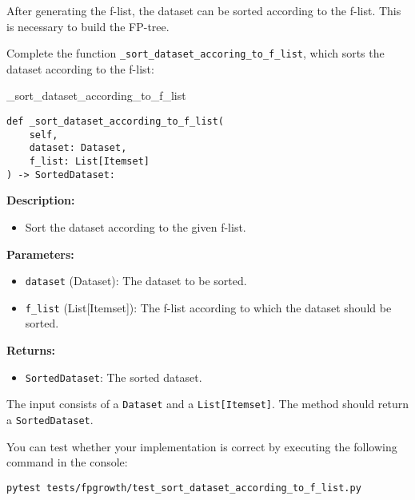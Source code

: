 \documentclass[
english,
smallborders
]{i6prcsht}
\begin{document}
After generating the f-list, the dataset can be sorted according to the f-list. This is necessary to build the FP-tree.

Complete the function \texttt{\_sort\_dataset\_accoring\_to\_f\_list}, which sorts the dataset according to the f-list:

\vspace*{0.3cm}

\begin{functionbox}{\_sort\_dataset\_according\_to\_f\_list}
	\begin{lstlisting}[numbers=none]
def _sort_dataset_according_to_f_list(
    self, 
    dataset: Dataset, 
    f_list: List[Itemset]
) -> SortedDataset:
\end{lstlisting}
	
	\textbf{Description:}
	\begin{itemize}[leftmargin=*,topsep=0pt]
		\item Sort the dataset according to the given f-list.
	\end{itemize}
	
	\textbf{Parameters:}
	\begin{itemize}[leftmargin=*,topsep=0pt]
		\item \texttt{dataset} (Dataset): The dataset to be sorted.
		\item \texttt{f\_list} (List[Itemset]): The f-list according to which the dataset should be sorted.
	\end{itemize}
	
	\textbf{Returns:}
	\begin{itemize}[leftmargin=*,topsep=0pt]
		\item \texttt{SortedDataset}: The sorted dataset.
	\end{itemize}
\end{functionbox}

\vspace*{0.5cm}

The input consists of a \texttt{Dataset} and a \texttt{List[Itemset]}. The method should return a \texttt{SortedDataset}.

You can test whether your implementation is correct by executing the following command in the console:

\vspace*{0.3cm}

\begin{lstlisting}
pytest tests/fpgrowth/test_sort_dataset_according_to_f_list.py
\end{lstlisting}
\end{document}
